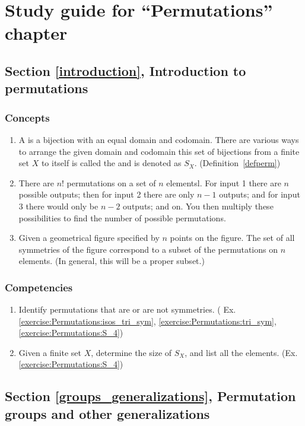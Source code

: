 \section{Study guide  for ``Permutations''  chapter}\label{sec:Permutations:study} 


\subsection*{Section \ref{introduction}, Introduction to permutations}
\subsubsection*{Concepts}
\begin{enumerate}
\item 
A  is a bijection with an equal domain and codomain. There are various ways to arrange the given domain and codomain this set of bijections from a finite set $X$ to itself is called the  and is denoted as $S_X$. (Definition~\ref{defperm})
\item
There are $n!$  permutations on a set of $n$ elementsl. For input 1 there are $n$ possible outputs; then for input 2 there are only $n-1$ outputs; and for input 3 there would only be $n-2$ outputs; and on.  You then multiply these possibilities to find the number of possible permutations.  
\item
Given a  geometrical figure specified by $n$ points on the figure. The set of all symmetries of the figure correspond to  a subset of the permutations on $n$ elements. (In general, this will be a proper subset.)
\end{enumerate}

\subsubsection*{Competencies}
\begin{enumerate}
\item
Identify  permutations that are or are not symmetries. ( Ex.  \ref{exercise:Permutations:isos_tri_sym}, \ref{exercise:Permutations:tri_sym},  \ref{exercise:Permutations:S_4})
\item
Given a finite set $X$, determine the size of $S_X$, and list all the elements. (Ex. \ref{exercise:Permutations:S_4})
\end{enumerate}


\subsection*{Section \ref{groups_generalizations}, Permutation groups and other generalizations}
